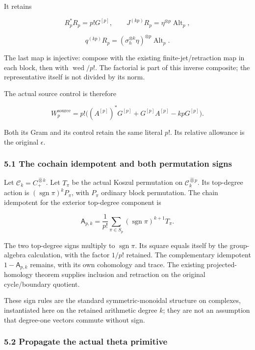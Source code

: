 It retains

\[
R_p^*R_p=p!G^{[p]},\qquad
J^{(kp)}R_p=\eta^{\otimes p}\operatorname{Alt}_p,
\]

\[
q^{(kp)}R_p=(\sigma_h^{\otimes k}\eta)^{\otimes p}
             \operatorname{Alt}_p.
\]

The last map is injective: compose with the existing
finite-jet/retraction map in each block, then with
\(\operatorname{wed}/p!\). The factorial is part of this inverse
composite; the representative itself is not divided by its norm.

The actual source control is therefore

\[
W_p^{\mathrm{source}}=p!\bigl((A^{[p]})^*G^{[p]}+G^{[p]}A^{[p]}-kpG^{[p]}\bigr).
\]

Both its Gram and its control retain the same literal \(p!\). Its
relative allowance is the original \(\epsilon\).

\subsubsection{5.1 The cochain idempotent and both permutation
signs}\label{exterior_trace:the-cochain-idempotent-and-both-permutation-signs}

Let \(\mathcal C_k=C_+^{\widehat\otimes k}\). Let \(T_\pi\) be the
actual Koszul permutation on \(\mathcal C_k^{\widehat\otimes p}\). Its
top-degree action is \((\operatorname{sgn}\pi)^kP_\pi\), with \(P_\pi\)
ordinary block permutation. The chain idempotent for the exterior
top-degree component is

\[
\boxed{
\mathsf A_{p,k}
=\frac1{p!}\sum_{\pi\in S_p}
 (\operatorname{sgn}\pi)^{k+1}T_\pi.
}
\]

The two top-degree signs multiply to \(\operatorname{sgn}\pi\). Its
square equals itself by the group-algebra calculation, with the factor
\(1/p!\) retained. The complementary idempotent \(1-\mathsf A_{p,k}\)
remains, with its own cohomology and trace. The existing
projected-homology theorem supplies inclusion and retraction on the
original cycle/boundary quotient.

These sign rules are the standard symmetric-monoidal structure on
complexes, instantiated here on the retained arithmetic degree \(k\);
they are not an assumption that degree-one vectors commute without sign.

\subsubsection{5.2 Propagate the actual theta
primitive}\label{exterior_trace:propagate-the-actual-theta-primitive}

